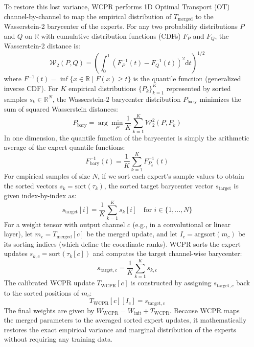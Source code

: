 \documentclass{article}
\theoremstyle{plain}
\theoremstyle{definition}
\theoremstyle{remark}
\begin{document}
To restore this lost variance, WCPR performs 1D Optimal Transport (OT) channel-by-channel to map the empirical distribution of $T_{\text{merged}}$ to the Wasserstein-2 barycenter of the experts. For any two probability distributions $P$ and $Q$ on $\mathbb{R}$ with cumulative distribution functions (CDFs) $F_P$ and $F_Q$, the Wasserstein-2 distance is:
\begin{equation}
    \mathcal{W}_2(P, Q) = \left( \int_{0}^{1} \left( F_P^{-1}(t) - F_Q^{-1}(t) \right)^2 \mathrm{d}t \right)^{1/2}
\end{equation}
where $F^{-1}(t) = \inf \{ x \in \mathbb{R} \mid F(x) \geq t \}$ is the quantile function (generalized inverse CDF). For $K$ empirical distributions $\{P_k\}_{k=1}^K$ represented by sorted samples $s_{k} \in \mathbb{R}^N$, the Wasserstein-2 barycenter distribution $P_{\text{bary}}$ minimizes the sum of squared Wasserstein distances:
\begin{equation}
    P_{\text{bary}} = \arg\min_P \frac{1}{K} \sum_{k=1}^K \mathcal{W}_2^2(P, P_k)
\end{equation}
In one dimension, the quantile function of the barycenter is simply the arithmetic average of the expert quantile functions:
\begin{equation}
    F_{\text{bary}}^{-1}(t) = \frac{1}{K} \sum_{k=1}^K F_{P_k}^{-1}(t)
\end{equation}
For empirical samples of size $N$, if we sort each expert's sample values to obtain the sorted vectors $s_{k} = \text{sort}(\tau_k)$, the sorted target barycenter vector $s_{\text{target}}$ is given index-by-index as:
\begin{equation}
    s_{\text{target}}[i] = \frac{1}{K} \sum_{k=1}^K s_{k}[i] \quad \text{for } i \in \{1, \dots, N\}
\end{equation}
For a weight tensor with output channel $c$ (e.g., in a convolutional or linear layer), let $m_c = T_{\text{merged}}[c]$ be the merged update, and let $I_c = \text{argsort}(m_c)$ be its sorting indices (which define the coordinate ranks). WCPR sorts the expert updates $s_{k,c} = \text{sort}(\tau_k[c])$ and computes the target channel-wise barycenter:
\begin{equation}
    s_{\text{target},c} = \frac{1}{K} \sum_{k=1}^K s_{k,c}
\end{equation}
The calibrated WCPR update $T_{\text{WCPR}}[c]$ is constructed by assigning $s_{\text{target},c}$ back to the sorted positions of $m_c$:
\begin{equation}
    T_{\text{WCPR}}[c][I_c] = s_{\text{target},c}
\end{equation}
The final weights are given by $W_{\text{WCPR}} = W_{\text{init}} + T_{\text{WCPR}}$. Because WCPR maps the merged parameters to the averaged sorted expert updates, it mathematically restores the exact empirical variance and marginal distribution of the experts without requiring any training data.
\end{document}
